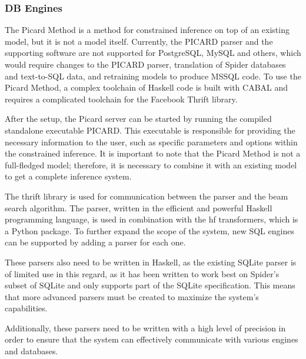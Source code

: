 \subsubsection{DB Engines}

The Picard Method is a method for constrained inference on top of an existing model, but it is not a model itself. Currently, the PICARD parser and the supporting software are not supported for PostgreSQL, MySQL and others, which would require changes to the PICARD parser, translation of Spider databases and text-to-SQL data, and retraining models to produce MSSQL code. To use the Picard Method, a complex toolchain of Haskell code is built with CABAL and requires a complicated toolchain for the Facebook Thrift library.

After the setup, the Picard server can be started by running the compiled standalone executable PICARD. This executable is responsible for providing the necessary information to the user, such as specific parameters and options within the constrained inference. It is important to note that the Picard Method is not a full-fledged model; therefore, it is necessary to combine it with an existing model to get a complete inference system.

The thrift library is used for communication between the parser and the beam search algorithm. The parser, written in the efficient and powerful Haskell programming language, is used in combination with the hf transformers, which is a Python package. To further expand the scope of the system, new SQL engines can be supported by adding a parser for each one.

These parsers also need to be written in Haskell, as the existing SQLite parser is of limited use in this regard, as it has been written to work best on Spider's subset of SQLite and only supports part of the SQLite specification. This means that more advanced parsers must be created to maximize the system's capabilities.

Additionally, these parsers need to be written with a high level of precision in order to ensure that the system can effectively communicate with various engines and databases.